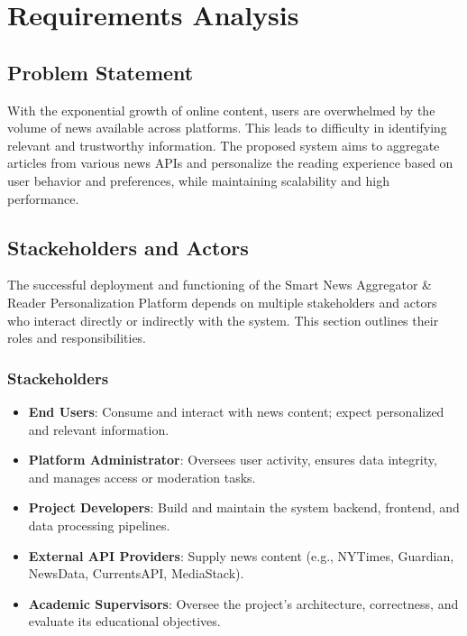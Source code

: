 

\chapter{Requirements Analysis}\label{ch:requiremnts-analysis}


\section{Problem Statement}\label{sec:problem-statement}

With the exponential growth of online content, users are overwhelmed by the volume of news available across platforms.
This leads to difficulty in identifying relevant and trustworthy information.
The proposed system aims to aggregate articles from various news APIs and personalize the reading experience based on user behavior and preferences, while maintaining scalability and high performance.


\section{Stackeholders and Actors}\label{sec:stackeholders-actors}

The successful deployment and functioning of the Smart News Aggregator \& Reader Personalization Platform depends on multiple stakeholders and actors who interact directly or indirectly with the system.
This section outlines their roles and responsibilities.

\subsection{Stackeholders}\label{subsec:stackeholders}

\begin{itemize}
    \item \textbf{End Users}: Consume and interact with news content; expect personalized and relevant information.
    \item \textbf{Platform Administrator}: Oversees user activity, ensures data integrity, and manages access or moderation tasks.
    \item \textbf{Project Developers}: Build and maintain the system backend, frontend, and data processing pipelines.
    \item \textbf{External API Providers}: Supply news content (e.g., NYTimes, Guardian, NewsData, CurrentsAPI, MediaStack).
    \item \textbf{Academic Supervisors}: Oversee the project's architecture, correctness, and evaluate its educational objectives.
\end{itemize}

